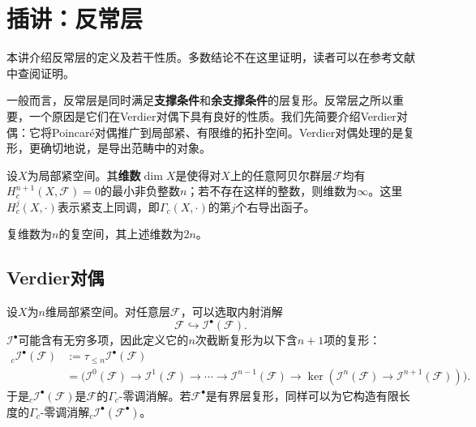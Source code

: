 \chapter{插讲：反常层}\label{L13}
本讲介绍反常层的定义及若干性质。多数结论不在这里证明，读者可以在参考文献中查阅证明。

一般而言，反常层是同时满足\textbf{支撑条件}和\textbf{余支撑条件}的层复形。反常层之所以重要，一个原因是它们在Verdier对偶下具有良好的性质。我们先简要介绍Verdier对偶：它将Poincaré对偶推广到局部紧、有限维的拓扑空间。Verdier对偶处理的是复形，更确切地说，是导出范畴中的对象。
\begin{definition}\label{L13S0O1}
设$X$为局部紧空间。其\textbf{维数}$\dim X$是使得对$X$上的任意阿贝尔群层$\mathcal F$均有$H_c^{n+1}(X,\mathcal F)=0$的最小非负整数$n$；若不存在这样的整数，则维数为$\infty$。这里$H_c^j(X,\cdot)$表示紧支上同调，即$\Gamma_c(X,\cdot)$的第$j$个右导出函子。
\end{definition}
\begin{note}[L13S0O2]
复维数为$n$的复空间，其上述维数为$2n$。
\end{note}
\section{Verdier对偶}\label{L13S1}
设$X$为$n$维局部紧空间。对任意层$\mathcal F$，可以选取内射消解
\[\mathcal F\hookrightarrow\mathcal I^\bullet(\mathcal F).\]
$\mathcal I^\bullet$可能含有无穷多项，因此定义它的$n$次截断复形为以下含$n+1$项的复形：
\begin{equation}\tag{1.1}\label{L13eq11}
\begin{aligned}
{}_c\mathcal I^\bullet(\mathcal F)&:=\tau_{\le n}\mathcal I^\bullet(\mathcal F)\\
&=\bigl(\mathcal I^0(\mathcal F)\to\mathcal I^1(\mathcal F)\to\cdots\to\mathcal I^{n-1}(\mathcal F)\to\ker(\mathcal I^n(\mathcal F)\to\mathcal I^{n+1}(\mathcal F))\bigr).
\end{aligned}
\end{equation}
于是${}_c\mathcal I^\bullet(\mathcal F)$是$\mathcal F$的$\Gamma_c$-零调消解。若$\mathcal F^\bullet$是有界层复形，同样可以为它构造有限长度的$\Gamma_c$-零调消解${}_c\mathcal I^\bullet(\mathcal F^\bullet)$。

